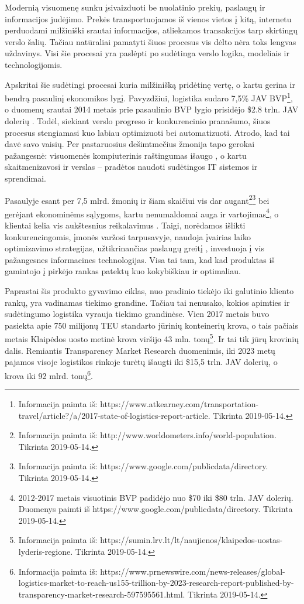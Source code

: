 
Modernią visuomenę sunku įsivaizduoti be nuolatinio prekių, paslaugų ir informacijos judėjimo. Prekės transportuojamos iš vienos vietos į kitą, internetu perduodami milžiniški srautai informacijos, atliekamos transakcijos tarp skirtingų verslo šalių. Tačiau natūraliai pamatyti šiuos procesus vis dėlto nėra toks lengvas uždavinys. Visi šie procesai yra paslėpti po sudėtinga verslo logika, modeliais ir technologijomis. 

Apskritai šie sudėtingi procesai kuria milžinišką pridėtinę vertę, o kartu gerina ir bendrą pasaulinį ekonomikos lygį. Pavyzdžiui, logistika sudaro 7,5\% JAV BVP\footnote{Informacija paimta iš: https://www.atkearney.com/transportation-travel/article?/a/2017-state-of-logistics-report-article. Tikrinta 2019-05-14.}, o duomenų srautai 2014 metais prie pasaulinio BVP lygio prisidėjo \$2.8 trln. JAV dolerių \cite{manyika2016digital}. Todėl, siekiant verslo progreso ir konkurencinio pranašumo, šiuos procesus stengiamasi kuo labiau optimizuoti bei automatizuoti. Atrodo, kad tai davė savo vaisių. Per pastaruosius dešimtmečius žmonija tapo gerokai pažangesnė: visuomenės kompiuterinis raštingumas išaugo \cite{van2015internet}, o kartu skaitmenizavosi ir verslas – pradėtos naudoti sudėtingos IT sistemos ir sprendimai.

Pasaulyje esant per 7,5 mlrd. žmonių ir šiam skaičiui vis dar augant\footnote{Informacija paimta iš: http://www.worldometers.info/world-population. Tikrinta 2019-05-14.}\footnote{\label{note1}Informacija paimta iš: https://www.google.com/publicdata/directory. Tikrinta 2019-05-14.} bei gerėjant ekonominėms sąlygoms, kartu nenumaldomai auga ir vartojimas\footnote{2012-2017 metais visuotinis BVP padidėjo nuo \$70 iki \$80 trln. JAV dolerių. Duomenys paimti iš https://www.google.com/publicdata/directory. Tikrinta 2019-05-14.}, o klientai kelia vis aukštesnius reikalavimus \cite{nilsson2006logistics}. Taigi, norėdamos išlikti konkurencingomis, įmonės varžosi tarpusavyje, naudoja įvairias laiko optimizavimo strategijas, užtikrinančias paslaugų greitį \cite{zacharia2004logistics}, investuoja į vis pažangesnes informacines technologijas. Visa tai tam, kad kad produktas iš gamintojo į pirkėjo rankas patektų kuo kokybiškiau ir optimaliau.

Paprastai šis produkto gyvavimo ciklas, nuo pradinio tiekėjo iki galutinio kliento rankų, yra vadinamas tiekimo grandine. Tačiau tai nenusako, kokios apimties ir sudėtingumo logistika vyrauja tiekimo grandinėse. Vien 2017 metais buvo pasiekta apie 750 milijonų TEU standarto jūrinių konteinerių krova\footnotemark[\ref{note1}], o tais pačiais metais Klaipėdos uosto metinė krova viršijo 43 mln. tonų\footnote{Informacija paimta iš: https://sumin.lrv.lt/lt/naujienos/klaipedos-uostas-lyderis-regione. Tikrinta 2019-05-14.}. Ir tai tik jūrų krovinių dalis. Remiantis Transparency Market Research duomenimis, iki 2023 metų pajamos visoje logistikos rinkoje turėtų išaugti iki \$15,5 trln. JAV dolerių, o krova iki 92 mlrd. tonų\footnote{Informacija paimta iš: https://www.prnewswire.com/news-releases/global-logistics-market-to-reach-us155-trillion-by-2023-research-report-published-by-transparency-market-research-597595561.html. Tikrinta 2019-05-14.}.

